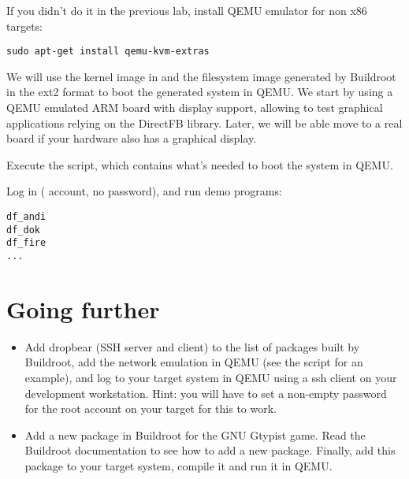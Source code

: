 If you didn't do it in the previous lab, install QEMU emulator for non
x86 targets:

\begin{verbatim}
sudo apt-get install qemu-kvm-extras
\end{verbatim}

We will use the kernel image in  and the filesystem image
generated by Buildroot in the ext2 format to boot the generated system
in QEMU. We start by using a QEMU emulated ARM board with display
support, allowing to test graphical applications relying on the
DirectFB library. Later, we will be able move to a real board if your
hardware also has a graphical display.

Execute the  script, which contains what's needed
to boot the system in QEMU.

Log in ( account, no password), and run demo programs:

\begin{verbatim}
df_andi
df_dok
df_fire
...
\end{verbatim}

\section{Going further}

\begin{itemize}

\item Add dropbear (SSH server and client) to the list of packages
  built by Buildroot, add the network emulation in QEMU (see the
   script for an example), and log to
  your target system in QEMU using a ssh client on your development
  workstation. Hint: you will have to set a non-empty password for the
  root account on your target for this to work.

\item Add a new package in Buildroot for the GNU Gtypist game. Read
  the Buildroot documentation to see how to add a new
  package. Finally, add this package to your target system, compile it
  and run it in QEMU.

\end{itemize}
